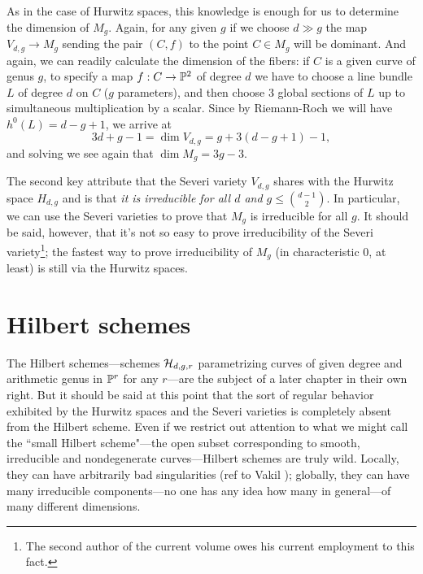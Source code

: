 As in the case of Hurwitz spaces, this knowledge is enough for us to determine the dimension of $M_g$. Again, for any given $g$ if we choose $d \gg g$ the map $V_{d,g} \to M_g$ sending the pair $(C, f)$ to the point $C \in M_g$ will be dominant. And again, we can readily calculate the dimension of the fibers: if $C$ is a given curve of genus $g$, to specify a map $f : C \to \PP^2$ of degree $d$ we have to choose a line bundle $L$ of degree $d$ on $C$ ($g$ parameters), and then choose 3 global sections of $L$ up to simultaneous multiplication by a scalar. Since by Riemann-Roch we will have $h^0(L) = d-g+1$, we arrive at
$$
3d+g-1 = \dim V_{d,g}  = g + 3(d-g+1) - 1,
$$
and solving we see again that $\dim M_g = 3g-3$.

The second key attribute that the Severi variety $V_{d,g}$ shares with the Hurwitz space $H_{d,g}$ and  is that \emph{it is irreducible for all $d$ and $g\leq \binom{d-1}{2}$}. In particular, we can use the Severi varieties to prove that $M_g$ is irreducible for all $g$. It should be said, however, that it's not so easy to prove irreducibility of the Severi variety\footnote{The second author of the current volume owes his current employment to this fact.}; the fastest way to prove irreducibility of $M_g$ (in characteristic 0, at least) is still via the Hurwitz spaces.

\section{Hilbert schemes}\label{hilbert scheme section}

The Hilbert schemes---schemes $\cH_{d,g,r}$ parametrizing curves of given degree and arithmetic genus in $\PP^r$ for any $r$---are the subject of a later chapter in their own right. But it should be said at this point that the sort of regular behavior exhibited by the Hurwitz spaces and the Severi varieties is completely absent from the Hilbert scheme. Even if we restrict out attention to  what we might call the ``small Hilbert scheme"---the open subset corresponding to smooth, irreducible and nondegenerate curves---Hilbert schemes are truly wild. Locally, they can have arbitrarily bad singularities (ref to Vakil ); globally, they can have many irreducible components---no one has any idea how many in general---of many different dimensions.

